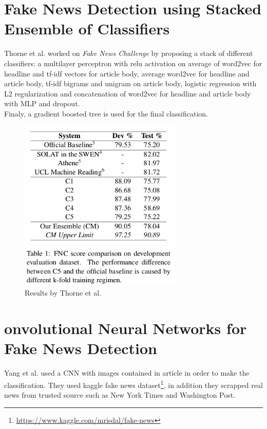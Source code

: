 \section{Fake News Detection using Stacked Ensemble of Classifiers}
Thorne et al.\cite{Thorne2017} worked on \textit{Fake News Challenge} by proposing a stack of different classifiers: a multilayer perceptron with relu activation on average of word2vec for headline and tf-idf vectors for article body, average word2vec for headline and article body, tf-idf bigrams and unigram on article body, logistic regression with L2 regularization and concatenation of word2vec for headline and article body with MLP and dropout. \\

Finaly, a gradient boosted tree is used for the final classification. \\

\begin{figure}[h]
	\centering
	\includegraphics[width=0.7\textwidth]{images/chap1_bis/rev6.png}
	\caption{Results by Thorne et al. }
	\label{fig:chap1:thorn1}
\end{figure}

\section{onvolutional Neural Networks for Fake News Detection\cite{Yang2018}}
Yang et al. used a CNN with images contained in article in order to make the classification. They used kaggle fake news dataset\footnote{\url{https://www.kaggle.com/mrisdal/fake-news}}, in addition they scrapped real news from trusted source such as New York Times and Washington Post. \\


